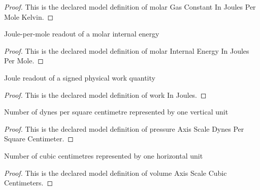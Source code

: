\begin{proof}
  This is the declared model definition of molar Gas Constant In Joules Per Mole Kelvin.
\end{proof}
\begin{definition}
  \label{def:physics:phyx-mini-0358:phyxminiproblems-problemphyxmini0358-molarinternalenergyinjoulespermole}
  Joule-per-mole readout of a molar internal energy
\end{definition}
\begin{proof}
  This is the declared model definition of molar Internal Energy In Joules Per Mole.
\end{proof}
\begin{definition}
  \label{def:physics:phyx-mini-0358:phyxminiproblems-problemphyxmini0358-workinjoules}
  Joule readout of a signed physical work quantity
\end{definition}
\begin{proof}
  This is the declared model definition of work In Joules.
\end{proof}
\begin{definition}
  \label{def:physics:phyx-mini-0358:phyxminiproblems-problemphyxmini0358-pressureaxisscaledynespersquarecentimeter}
  Number of dynes per square centimetre represented by one vertical unit
\end{definition}
\begin{proof}
  This is the declared model definition of pressure Axis Scale Dynes Per Square Centimeter.
\end{proof}
\begin{definition}
  \label{def:physics:phyx-mini-0358:phyxminiproblems-problemphyxmini0358-volumeaxisscalecubiccentimeters}
  Number of cubic centimetres represented by one horizontal unit
\end{definition}
\begin{proof}
  This is the declared model definition of volume Axis Scale Cubic Centimeters.
\end{proof}
